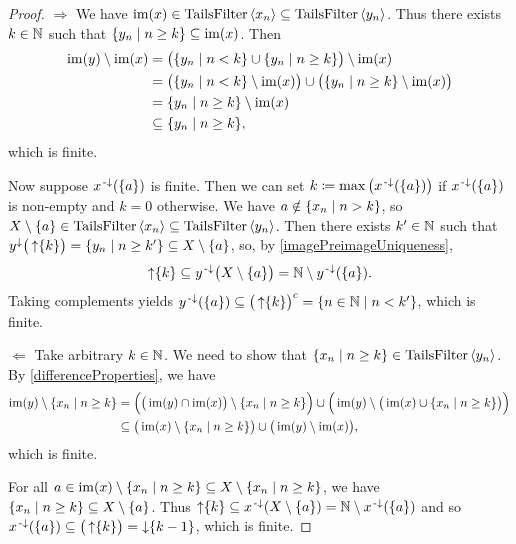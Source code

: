 \begin{proof}
$\boxed{\Rightarrow}$ We have $\operatorname{im}(x)\in \operatorname{TailsFilter}\left\langle x_n \right\rangle \subseteq \operatorname{TailsFilter}\left\langle y_n \right\rangle$. Thus there exists $k\in \mathbb{N}$ such that $\setbuilder{y_n}{n\geq k} \subseteq \im(x)$. Then
\begin{align*}
\im(y)\setminus \im(x) &= \big(\setbuilder{y_n}{n < k}\cup\setbuilder{y_n}{n\geq k}\big)\setminus\im(x) \\
&= \big(\setbuilder{y_n}{n < k}\setminus\im(x)\big)\cup\big(\setbuilder{y_n}{n\geq k}\setminus\im(x)\big) \\
&= \setbuilder{y_n}{n\geq k}\setminus\im(x) \\
&\subseteq \setbuilder{y_n}{n\geq k},
\end{align*}
which is finite.

Now suppose $x^{\text{\hspace{0.15em}-}\downarrow}(\{a\})$ is finite. Then we can set $k\coloneqq \max\big(x^{\text{\hspace{0.15em}-}\downarrow}(\{a\})\big)$ if $x^{\text{\hspace{0.15em}-}\downarrow}(\{a\})$ is non-empty and $k = 0$ otherwise. We have $a\notin \setbuilder{x_n}{n>k}$, so $X\setminus \{a\} \in \operatorname{TailsFilter}\left\langle x_n \right\rangle\subseteq \operatorname{TailsFilter}\left\langle y_n \right\rangle$. Then there exists $k'\in \mathbb{N}$ such that $y^\imf\big(\upset \{k\}\big) = \setbuilder{y_n}{n\geq k'}\subseteq X\setminus \{a\}$, so, by \ref{imagePreimageUniqueness},
\[ \operatorname{\uparrow}\{k\} \subseteq y^{\text{\hspace{0.15em}-}\downarrow}\big(X\setminus \{a\}\big) = \mathbb{N} \setminus y^{\text{\hspace{0.15em}-}\downarrow}(\{a\}). \]
Taking complements yields $y^\preimf(\{a\}) \subseteq \big(\upset\{k\}\big)^c = \setbuilder{n\in \N}{n < k'}$, which is finite.

$\boxed{\Leftarrow}$ Take arbitrary $k\in \mathbb{N}$. We need to show that $\setbuilder{x_n}{n\geq k}\in \TailsFilter\seq{y_n}$. By \ref{differenceProperties}, we have
\begin{align*}
\im(y)\setminus \setbuilder{x_n}{n\geq k} &= \Big(\big(\im(y)\cap \im(x)\big)\setminus \setbuilder{x_n}{n\geq k}\Big) \cup \Big(\im(y)\setminus \big(\im(x) \cup \setbuilder{x_n}{n\geq k}\big)\Big) \\
&\subseteq \big(\im(x)\setminus \setbuilder{x_n}{n\geq k}\big) \cup \big(\im(y)\setminus \im(x)\big),
\end{align*}
which is finite.

For all $a\in \im(x)\setminus \setbuilder{x_n}{n\geq k} \subseteq X\setminus \setbuilder{x_n}{n\geq k}$, we have $\setbuilder{x_n}{n\geq k} \subseteq X\setminus \{a\}$. Thus $\operatorname{\uparrow}\{k\} \subseteq x^{\text{\hspace{0.15em}-}\downarrow}(X\setminus \{a\}) = \mathbb{N}\setminus x^{\text{\hspace{0.15em}-}\downarrow}(\{a\})$ and so $x^{\text{\hspace{0.15em}-}\downarrow}(\{a\}) \subseteq \big(\operatorname{\uparrow}\{k\}\big) = \operatorname{\downarrow}\{k-1\}$, which is finite.


\end{proof}

